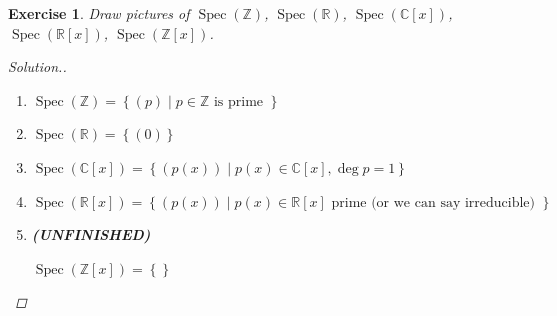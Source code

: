 \documentclass{article}
\theoremstyle{breakstyle}
\newtheorem{exercise}{Exercise}
\newenvironment{solution}
  {\begin{proof}[Solution.]\renewcommand{\qedsymbol}{}}
  {\end{proof}}
\DeclareMathOperator{\spec}{Spec}
\begin{document}
\begin{exercise}
Draw pictures of \(\spec(\mathbb Z)\), \(\spec(\mathbb R)\), \(\spec(\mathbb C[x])\), \(\spec(\mathbb R[x])\), \(\spec(\mathbb Z[x])\).

\begin{solution}
    \begin{enumerate}[label=({\roman*})]
            \item $\spec(\mathbb{Z})=\left\{ (p)\mid p\in \mathbb{Z}\text{ is prime } \right\} $
            \item $\spec(\mathbb{R})=\left\{ (0) \right\} $
            \item $\spec(\mathbb{C}[x])=\left\{\left( p(x) \right) \mid p(x)\in \mathbb{C}[x],\deg p=1 \right\} $
            \item $\spec(\mathbb{R}[x])=\left\{ \left( p(x) \right) \mid p(x)\in \mathbb{R}[x]\text{ prime (or we can say irreducible) } \right\} $
            \item \textbf{(UNFINISHED)}

                $\spec(\mathbb{Z}[x])=\left\{  \right\} $
        \end{enumerate}
\end{solution}
\end{exercise}
\end{document}
